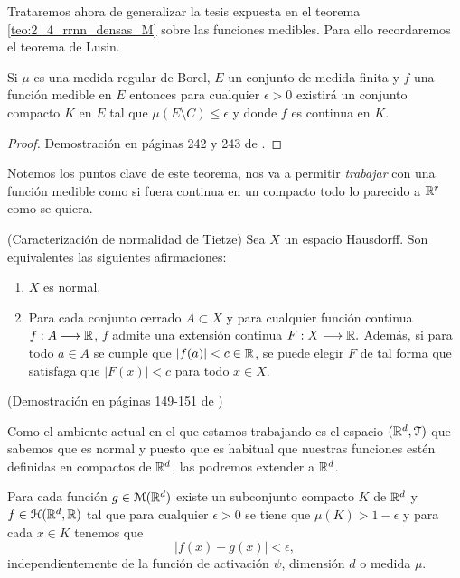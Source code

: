 %

Trataremos ahora de generalizar la tesis expuesta en 
 el teorema \ref{teo:2_4_rrnn_densas_M} sobre las funciones medibles. 
 Para ello recordaremos el teorema de Lusin.
\begin{teorema} \label{teo:Lusin}
    Si $\mu$ es una medida regular de Borel, $E$ un conjunto de medida finita 
    y $f$ una función medible en $E$ entonces
    para cualquier $\epsilon > 0$ existirá un conjunto compacto 
    $K$ en $E$ tal que $\mu(E \setminus C) \leq \epsilon$ y donde $f$ es continua en $K$. 
\end{teorema}
\begin{proof}
    Demostración en páginas 242 y 243 de \cite{nla.cat-vn1819421}.
\end{proof}  

Notemos los puntos clave de este teorema, nos va a permitir \textit{trabajar} con una función medible como si fuera continua en un compacto
todo lo parecido a $\mathbb{R}^r$ como se quiera. 
 
\begin{teorema}(Caracterización de normalidad de Tietze)\label{teo:Tietze}
    Sea $X$ un espacio Hausdorff. Son equivalentes las siguientes afirmaciones: 
    \begin{enumerate}
        \item $X$ es normal.
        \item Para cada conjunto cerrado $A \subset X$ y para cualquier función continua 
        $f: A \longrightarrow \mathbb{R}$, $f$ admite una extensión continua $F:X \longrightarrow \mathbb{R}.$
        Además, si para todo $a \in A$ se cumple que $|f(a)| < c \in \mathbb{R}$, se puede elegir $F$
        de tal forma que satisfaga que $|F(x)| < c$ para todo $x\in X.$ 
    \end{enumerate}
    (Demostración en páginas 149-151 de \cite{james1966topology})
\end{teorema}

Como el ambiente actual en el que estamos trabajando 
es el espacio $(\mathbb{R}^d, \mathcal{T})$ que sabemos que es normal y puesto que es habitual que nuestras funciones estén definidas
en  compactos de $\mathbb{R}^d$, las podremos extender a $\mathbb{R}^d$. 


\begin{corolario} \label{cor:2_1}
    Para cada función $g \in \mathcal{M}(\mathbb{R}^d)$ existe un subconjunto compacto 
    $K$ de $\mathbb{R}^d$ y $f \in \mathcal{H}(\mathbb{R}^d,\mathbb{R})$ tal que para cualquier 
    $\epsilon > 0$ se tiene que 
    $\mu(K) > 1- \epsilon$ y para cada $x \in K$ tenemos que 
    \begin{equation}
        |f(x) - g(x) | < \epsilon,
    \end{equation}
    independientemente de la función de activación $\psi$, dimensión $d$ o medida $\mu$. 
\end{corolario}

